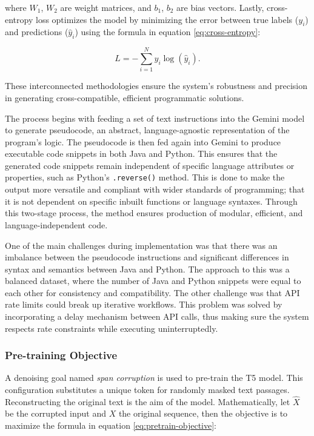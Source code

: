 \documentclass{dhbenelux}
\begin{document}
where \( W_1 \), \( W_2 \) are weight matrices, and \( b_1 \), \( b_2 \) are bias vectors. Lastly, cross-entropy loss optimizes the model by minimizing the error between true labels (\( y_i \)) and predictions (\( \hat{y}_i \)) using the formula in equation \ref{eq:cross-entropy}:

\begin{equation}
L = -\sum_{i=1}^N y_i \log(\hat{y}_i).
\label{eq:cross-entropy}
\end{equation}

These interconnected methodologies ensure the system’s robustness and precision in generating cross-compatible, efficient programmatic solutions.


The process begins with feeding a set of text instructions into the Gemini model to generate pseudocode, an abstract, language-agnostic representation of the program's logic. The pseudocode is then fed again into Gemini to produce executable code snippets in both Java and Python. This ensures that the generated code snippets remain independent of specific language attributes or properties, such as Python's \texttt{.reverse()} method. This is done to make the output more versatile and compliant with wider standards of programming; that it is not dependent on specific inbuilt functions or language syntaxes. Through this two-stage process, the method ensures production of modular, efficient, and language-independent code.



One of the main challenges during implementation was that there was an imbalance between the pseudocode instructions and significant differences in syntax and semantics between Java and Python. The approach to this was a balanced dataset, where the number of Java and Python snippets were equal to each other for consistency and compatibility. The other challenge was that API rate limits could break up iterative workflows. This problem was solved by incorporating a delay mechanism between API calls, thus making sure the system respects rate constraints while executing uninterruptedly.

\subsubsection{Pre-training Objective}
A denoising goal named \textit{span corruption} is used to pre-train the T5 model. This configuration substitutes a unique token for randomly masked text passages. Reconstructing the original text is the aim of the model. Mathematically, let \( \hat{X} \) be the corrupted input and \( X \) the original sequence, then the objective is to maximize the formula in equation \ref{eq:pretrain-objective}:
\end{document}
